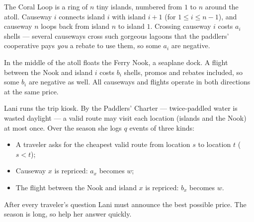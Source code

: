 The Coral Loop is a ring of $n$ tiny islands, numbered from $1$ to $n$ around the atoll. Causeway $i$ connects island $i$ with island $i+1$ (for $1 \le i \le n-1$), and causeway $n$ loops back from island $n$ to island $1$. Crossing causeway $i$ costs $a_i$ shells --- several causeways cross such gorgeous lagoons that the paddlers' cooperative pays \emph{you} a rebate to use them, so some $a_i$ are negative.

In the middle of the atoll floats the Ferry Nook, a seaplane dock. A flight between the Nook and island $i$ costs $b_i$ shells, promos and rebates included, so some $b_i$ are negative as well. All causeways and flights operate in both directions at the same price.

Lani runs the trip kiosk. By the Paddlers' Charter --- twice-paddled water is wasted daylight --- a valid route may visit each location (islands and the Nook) at most once. Over the season she logs $q$ events of three kinds:

\begin{itemize}
\item A traveler asks for the cheapest valid route from location $s$ to location $t$ ($s < t$);
\item Causeway $x$ is repriced: $a_x$ becomes $w$;
\item The flight between the Nook and island $x$ is repriced: $b_x$ becomes $w$.
\end{itemize}

After every traveler's question Lani must announce the best possible price. The season is long, so help her answer quickly.
